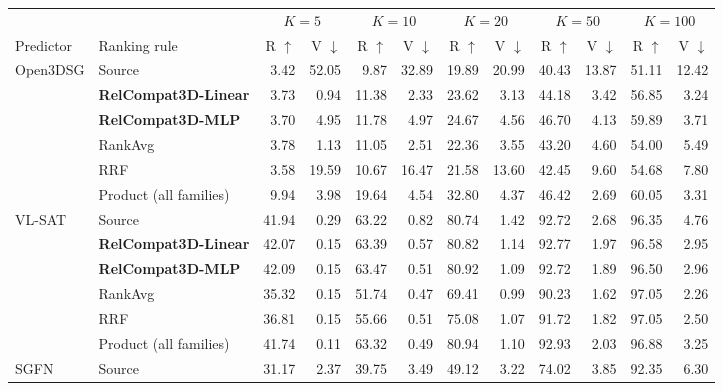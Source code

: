 \begin{table}[!t]
    \centering
    {\small
    \setlength{\tabcolsep}{2.0pt}
    \begin{tabular}{@{}llrrrrrrrrrr@{}}
    \toprule
    & & \multicolumn{2}{c}{$K=5$} & \multicolumn{2}{c}{$K=10$} &
    \multicolumn{2}{c}{$K=20$} & \multicolumn{2}{c}{$K=50$} &
    \multicolumn{2}{c}{$K=100$} \\
    \cmidrule(lr){3-4}\cmidrule(lr){5-6}\cmidrule(lr){7-8}\cmidrule(lr){9-10}\cmidrule(lr){11-12}
    Predictor & Ranking rule & R $\uparrow$ & V $\downarrow$ & R $\uparrow$ & V $\downarrow$ & R $\uparrow$ & V $\downarrow$ & R $\uparrow$ & V $\downarrow$ & R $\uparrow$ & V $\downarrow$ \\
    \midrule
    \multirow{6}{*}{Open3DSG}
    & Source & 3.42 & 52.05 & 9.87 & 32.89 & 19.89 & 20.99 & 40.43 & 13.87 & 51.11 & 12.42 \\
    & \textbf{RelCompat3D-Linear} & 3.73 & 0.94 & 11.38 & 2.33 & 23.62 & 3.13 & 44.18 & 3.42 & 56.85 & 3.24 \\
    & \textbf{RelCompat3D-MLP} & 3.70 & 4.95 & 11.78 & 4.97 & 24.67 & 4.56 & 46.70 & 4.13 & 59.89 & 3.71 \\
    & RankAvg & 3.78 & 1.13 & 11.05 & 2.51 & 22.36 & 3.55 & 43.20 & 4.60 & 54.00 & 5.49 \\
    & RRF & 3.58 & 19.59 & 10.67 & 16.47 & 21.58 & 13.60 & 42.45 & 9.60 & 54.68 & 7.80 \\
    & Product (all families) & 9.94 & 3.98 & 19.64 & 4.54 & 32.80 & 4.37 & 46.42 & 2.69 & 60.05 & 3.31 \\
    \midrule
    \multirow{6}{*}{VL-SAT}
    & Source & 41.94 & 0.29 & 63.22 & 0.82 & 80.74 & 1.42 & 92.72 & 2.68 & 96.35 & 4.76 \\
    & \textbf{RelCompat3D-Linear} & 42.07 & 0.15 & 63.39 & 0.57 & 80.82 & 1.14 & 92.77 & 1.97 & 96.58 & 2.95 \\
    & \textbf{RelCompat3D-MLP} & 42.09 & 0.15 & 63.47 & 0.51 & 80.92 & 1.09 & 92.72 & 1.89 & 96.50 & 2.96 \\
    & RankAvg & 35.32 & 0.15 & 51.74 & 0.47 & 69.41 & 0.99 & 90.23 & 1.62 & 97.05 & 2.26 \\
    & RRF & 36.81 & 0.15 & 55.66 & 0.51 & 75.08 & 1.07 & 91.72 & 1.82 & 97.05 & 2.50 \\
    & Product (all families) & 41.74 & 0.11 & 63.32 & 0.49 & 80.94 & 1.10 & 92.93 & 2.03 & 96.88 & 3.25 \\
    \midrule
    \multirow{6}{*}{SGFN}
    & Source & 31.17 & 2.37 & 39.75 & 3.49 & 49.12 & 3.22 & 74.02 & 3.85 & 92.35 & 6.30 \\

\end{tabular}}
\end{table}
